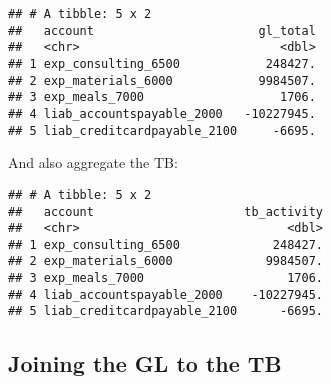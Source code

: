 \documentclass[
]{book}
\newenvironment{Shaded}{\begin{snugshade}}{\end{snugshade}}
\newcommand{\CommentTok}[1]{\textcolor[rgb]{0.56,0.35,0.01}{\textit{#1}}}
\newcommand{\DataTypeTok}[1]{\textcolor[rgb]{0.13,0.29,0.53}{#1}}
\newcommand{\KeywordTok}[1]{\textcolor[rgb]{0.13,0.29,0.53}{\textbf{#1}}}
\newcommand{\NormalTok}[1]{#1}
\newcommand{\OperatorTok}[1]{\textcolor[rgb]{0.81,0.36,0.00}{\textbf{#1}}}
\newcommand{\StringTok}[1]{\textcolor[rgb]{0.31,0.60,0.02}{#1}}
\begin{document}
\begin{Shaded}
\end{Shaded}

\begin{verbatim}
## # A tibble: 5 x 2
##   account                       gl_total
##   <chr>                            <dbl>
## 1 exp_consulting_6500            248427.
## 2 exp_materials_6000            9984507.
## 3 exp_meals_7000                   1706.
## 4 liab_accountspayable_2000   -10227945.
## 5 liab_creditcardpayable_2100     -6695.
\end{verbatim}

And also aggregate the TB:

\begin{Shaded}
\end{Shaded}

\begin{verbatim}
## # A tibble: 5 x 2
##   account                     tb_activity
##   <chr>                             <dbl>
## 1 exp_consulting_6500             248427.
## 2 exp_materials_6000             9984507.
## 3 exp_meals_7000                    1706.
## 4 liab_accountspayable_2000    -10227945.
## 5 liab_creditcardpayable_2100      -6695.
\end{verbatim}

\hypertarget{completeness-join}{%
\subsection{Joining the GL to the TB}\label{completeness-join}}
\end{document}
